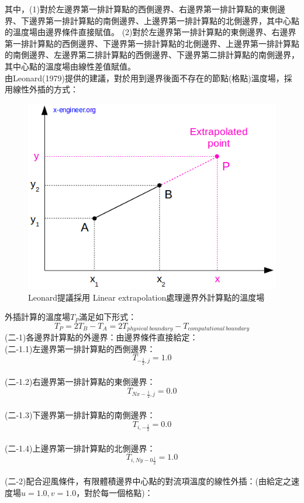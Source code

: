 \documentclass[12pt]{article}
\begin{document}
其中，(1)對於左邊界第一排計算點的西側邊界、右邊界第一排計算點的東側邊界、下邊界第一排計算點的南側邊界、上邊界第一排計算點的北側邊界，其中心點的溫度場由邊界條件直接賦值。
(2)對於左邊界第一排計算點的東側邊界、右邊界第一排計算點的西側邊界、下邊界第一排計算點的北側邊界、上邊界第一排計算點的南側邊界、左邊界第二排計算點的西側邊界、下邊界第二排計算點的南側邊界，其中心點的溫度場由線性差值賦值。\\
\noindent 由Leonard(1979)提供的建議，對於用到邊界後面不存在的節點(格點)溫度場，採用線性外插的方式：
\begin{figure}[H]
  \centering
  \includegraphics[scale = 0.5]{5.png}
  \caption{Leonard提議採用 Linear extrapolation處理邊界外計算點的溫度場}
  \label{fig:Linear_extrapolation}
\end{figure}
\noindent 外插計算的溫度場$T_{P}$滿足如下形式：
$$
  T_{P} = 2T_{B} - T_{A} = 2T_{physical\ boundary} - T_{computational\ boundary}
$$
\noindent (二-1)各邊界計算點的外邊界：由邊界條件直接給定：\\

\noindent (二-1.1)左邊界第一排計算點的西側邊界：$$T_{-\frac{1}{2},j} = 1.0$$\\
\noindent (二-1.2)右邊界第一排計算點的東側邊界：$$T_{Nx-\frac{1}{2},j} = 0.0$$\\
\noindent (二-1.3)下邊界第一排計算點的南側邊界：$$T_{i,-\frac{1}{2}} = 0.0$$\\
\noindent (二-1.4)上邊界第一排計算點的北側邊界：$$T_{i,Ny-0\frac{1}{2}} = 1.0$$\\
\noindent (二-2)配合迎風條件，有限體積邊界中心點的對流項溫度的線性外插：(由給定之速度場$u = 1.0 , v = 1.0$，對於每一個格點)：\\
\end{document}

